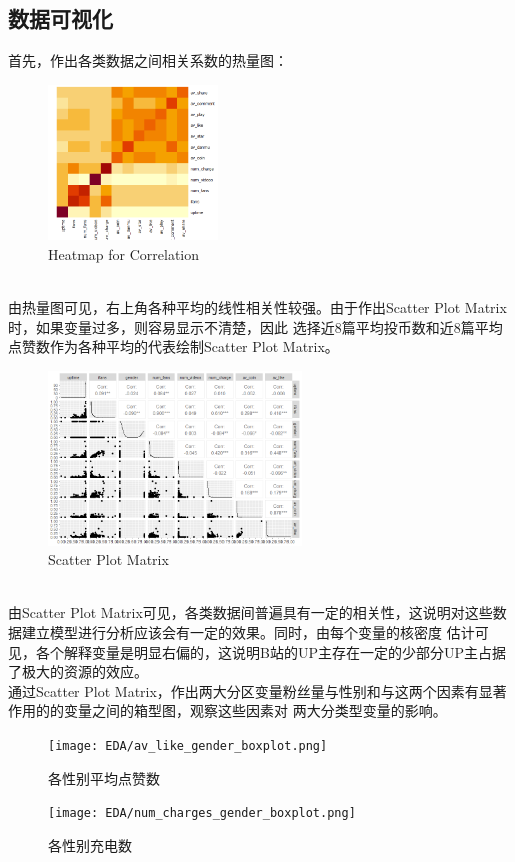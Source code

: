 \documentclass{ctexart}
\begin{document}
\subsection{数据可视化}
首先，作出各类数据之间相关系数的热量图：
\begin{figure}[htbp]
    \centering
    \includegraphics[width=0.40\textwidth]{EDA/Heatmap.png}
    \caption{Heatmap for Correlation}
\end{figure}\\
\indent 由热量图可见，右上角各种平均的线性相关性较强。由于作出Scatter Plot Matrix时，如果变量过多，则容易显示不清楚，因此
选择近8篇平均投币数和近8篇平均点赞数作为各种平均的代表绘制Scatter Plot Matrix。
\begin{figure}[htbp]
    \centering
    \includegraphics[width=0.60\textwidth]{EDA/Spm.png}
    \caption{Scatter Plot Matrix}
\end{figure}\\
\indent 由Scatter Plot Matrix可见，各类数据间普遍具有一定的相关性，这说明对这些数据建立模型进行分析应该会有一定的效果。同时，由每个变量的核密度
估计可见，各个解释变量是明显右偏的，这说明B站的UP主存在一定的少部分UP主占据了极大的资源的效应。\\
\indent 通过Scatter Plot Matrix，作出两大分区变量粉丝量与性别和与这两个因素有显著作用的的变量之间的箱型图，观察这些因素对
两大分类型变量的影响。
\begin{figure}[htbp]
    \begin{minipage}[t]{0.48\textwidth}
        \centering
        \texttt{[image: EDA/av\_like\_gender\_boxplot.png]}
        \caption{各性别平均点赞数}
    \end{minipage}
    \begin{minipage}[t]{0.48\textwidth}
        \centering
        \texttt{[image: EDA/num\_charges\_gender\_boxplot.png]}
        \caption{各性别充电数}
    \end{minipage}
\end{figure}
\end{document}
